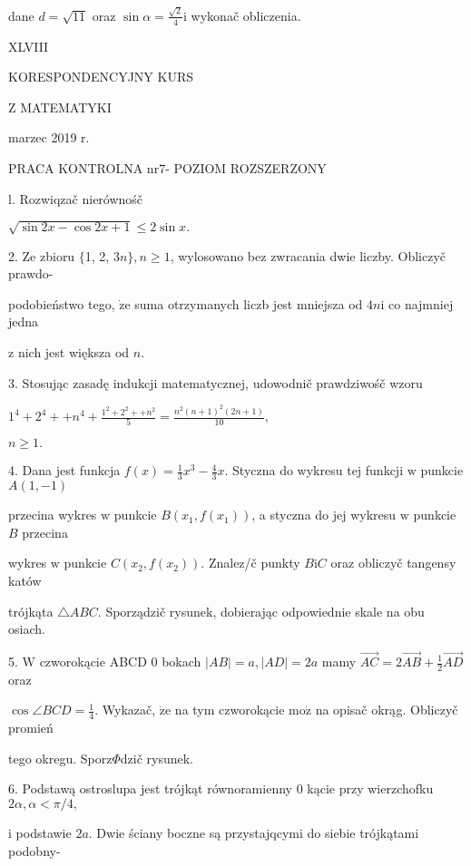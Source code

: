 \documentclass[a4paper,12pt]{article}
\begin{document}
dane $d=\sqrt{11}$ oraz $\displaystyle \sin\alpha=\frac{\sqrt{2}}{4}\mathrm{i}$ wykonač obliczenia.




XLVIII

KORESPONDENCYJNY KURS

Z MATEMATYKI

marzec 2019 r.

PRACA KONTROLNA $\mathrm{n}\mathrm{r} 7$- POZIOM ROZSZERZONY

l. Rozwiqzač nierównośč

$\sqrt{\sin 2x-\cos 2x+1}\leq 2\sin x.$

2. Ze zbioru $\{$1, 2, $3n\}, n\geq 1$, wylosowano bez zwracania dwie liczby. Obliczyč prawdo-

podobieństwo tego, $\dot{\mathrm{z}}\mathrm{e}$ suma otrzymanych liczb jest mniejsza od $4n\mathrm{i}$ co najmniej jedna

$\mathrm{z}$ nich jest większa od $n.$

3. Stosując zasadę indukcji matematycznej, udowodnič prawdziwośč wzoru

$1^{4}+2^{4}++n^{4}+\displaystyle \frac{1^{2}+2^{2}++n^{2}}{5}=\frac{n^{2}(n+1)^{2}(2n+1)}{10},$

$n\geq 1.$

4. Dana jest funkcja $f(x)=\displaystyle \frac{1}{3}x^{3}-\frac{4}{3}x$. Styczna do wykresu tej funkcji $\mathrm{w}$ punkcie $A(1,-1)$

przecina wykres $\mathrm{w}$ punkcie $B(x_{1},f(x_{1}))$, a styczna do jej wykresu $\mathrm{w}$ punkcie $B$ przecina

wykres $\mathrm{w}$ punkcie $C(x_{2},f(x_{2}))$. Znalez/č punkty $B \mathrm{i} C$ oraz obliczyč tangensy katów

trójkąta $\triangle ABC$. Sporządzič rysunek, dobierając odpowiednie skale na obu osiach.

5. $\mathrm{W}$ czworokącie ABCD $0$ bokach $|AB|=a, |AD|=2a$ mamy $\displaystyle \vec{AC}=2\vec{AB}+\frac{1}{2}\vec{AD}$ oraz

$\displaystyle \cos\angle BCD=\frac{1}{4}$. Wykazač, $\dot{\mathrm{z}}\mathrm{e}$ na tym czworokącie $\mathrm{m}\mathrm{o}\dot{\mathrm{z}}$ na opisač okrąg. Obliczyč promień

tego okregu. Sporz$\Phi$dzič rysunek.

6. Podstawą ostroslupa jest trójkąt równoramienny $0$ kącie przy wierzchofku $2\alpha, \alpha<\pi/4,$

$\mathrm{i}$ podstawie $2a$. Dwie ściany boczne są przystajqcymi do siebie trójkątami podobny-
\end{document}

